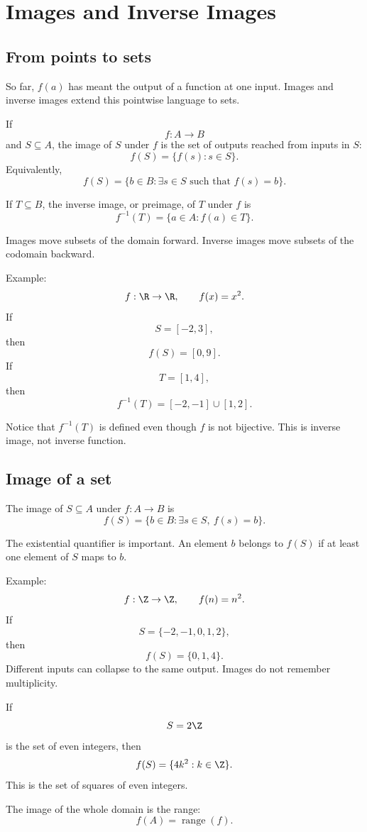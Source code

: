 \section{Images and Inverse Images}

\subsection{From points to sets}

So far, $f(a)$ has meant the output of a function at one input. Images and inverse images extend this pointwise language to sets.

If
\[
f:A\to B
\]
and $S\subseteq A$, the image of $S$ under $f$ is the set of outputs reached from inputs in $S$:
\[
f(S)=\{f(s):s\in S\}.
\]
Equivalently,
\[
f(S)=\{b\in B:\exists s\in S\text{ such that }f(s)=b\}.
\]

If $T\subseteq B$, the inverse image, or preimage, of $T$ under $f$ is
\[
f^{-1}(T)=\{a\in A:f(a)\in T\}.
\]

\begin{focusbox}
Images move subsets of the domain forward. Inverse images move subsets of the codomain backward.
\end{focusbox}

Example:
\[
f:\R\to\R,\qquad f(x)=x^2.
\]
If
\[
S=[-2,3],
\]
then
\[
f(S)=[0,9].
\]
If
\[
T=[1,4],
\]
then
\[
f^{-1}(T)=[-2,-1]\cup[1,2].
\]

Notice that $f^{-1}(T)$ is defined even though $f$ is not bijective. This is inverse image, not inverse function.

\subsection{Image of a set}

The image of $S\subseteq A$ under $f:A\to B$ is
\[
f(S)=\{b\in B:\exists s\in S,\ f(s)=b\}.
\]

The existential quantifier is important. An element $b$ belongs to $f(S)$ if at least one element of $S$ maps to $b$.

Example:
\[
f:\Z\to\Z,\qquad f(n)=n^2.
\]
If
\[
S=\{-2,-1,0,1,2\},
\]
then
\[
f(S)=\{0,1,4\}.
\]
Different inputs can collapse to the same output. Images do not remember multiplicity.

If
\[
S=2\Z
\]
is the set of even integers, then
\[
f(S)=\{4k^2:k\in\Z\}.
\]
This is the set of squares of even integers.

The image of the whole domain is the range:
\[
f(A)=\operatorname{range}(f).
\]

